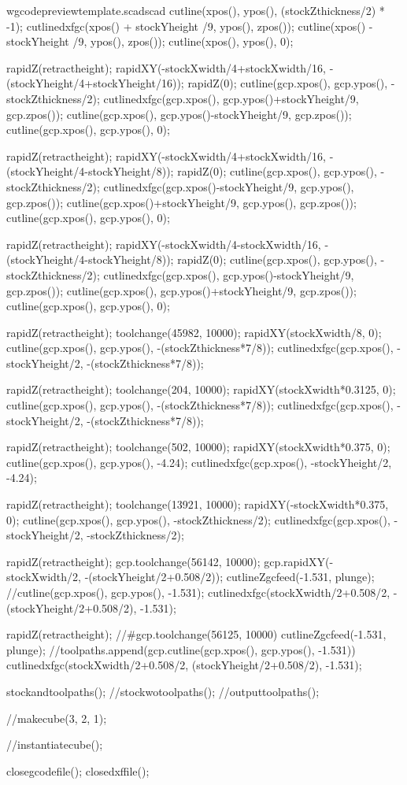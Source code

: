 \documentclass{ltxdoc}
\begin{document}
\begin{writecode}{w}{gcodepreviewtemplate.scad}{scad}
cutline(xpos(), ypos(), (stockZthickness/2) * -1);
cutlinedxfgc(xpos() + stockYheight /9, ypos(), zpos());
cutline(xpos() - stockYheight /9, ypos(), zpos());
cutline(xpos(), ypos(), 0);

rapidZ(retractheight);
rapidXY(-stockXwidth/4+stockXwidth/16, -(stockYheight/4+stockYheight/16));
rapidZ(0);
cutline(gcp.xpos(), gcp.ypos(), -stockZthickness/2);
cutlinedxfgc(gcp.xpos(), gcp.ypos()+stockYheight/9, gcp.zpos());
cutline(gcp.xpos(), gcp.ypos()-stockYheight/9, gcp.zpos());
cutline(gcp.xpos(), gcp.ypos(), 0);

rapidZ(retractheight);
rapidXY(-stockXwidth/4+stockXwidth/16, -(stockYheight/4-stockYheight/8));
rapidZ(0);
cutline(gcp.xpos(), gcp.ypos(), -stockZthickness/2);
cutlinedxfgc(gcp.xpos()-stockYheight/9, gcp.ypos(), gcp.zpos());
cutline(gcp.xpos()+stockYheight/9, gcp.ypos(), gcp.zpos());
cutline(gcp.xpos(), gcp.ypos(), 0);

rapidZ(retractheight);
rapidXY(-stockXwidth/4-stockXwidth/16, -(stockYheight/4-stockYheight/8));
rapidZ(0);
cutline(gcp.xpos(), gcp.ypos(), -stockZthickness/2);
cutlinedxfgc(gcp.xpos(), gcp.ypos()-stockYheight/9, gcp.zpos());
cutline(gcp.xpos(), gcp.ypos()+stockYheight/9, gcp.zpos());
cutline(gcp.xpos(), gcp.ypos(), 0);

rapidZ(retractheight);
toolchange(45982, 10000);
rapidXY(stockXwidth/8, 0);
cutline(gcp.xpos(), gcp.ypos(), -(stockZthickness*7/8));
cutlinedxfgc(gcp.xpos(), -stockYheight/2, -(stockZthickness*7/8));

rapidZ(retractheight);
toolchange(204, 10000);
rapidXY(stockXwidth*0.3125, 0);
cutline(gcp.xpos(), gcp.ypos(), -(stockZthickness*7/8));
cutlinedxfgc(gcp.xpos(), -stockYheight/2, -(stockZthickness*7/8));

rapidZ(retractheight);
toolchange(502, 10000);
rapidXY(stockXwidth*0.375, 0);
cutline(gcp.xpos(), gcp.ypos(), -4.24);
cutlinedxfgc(gcp.xpos(), -stockYheight/2, -4.24);

rapidZ(retractheight);
toolchange(13921, 10000);
rapidXY(-stockXwidth*0.375, 0);
cutline(gcp.xpos(), gcp.ypos(), -stockZthickness/2);
cutlinedxfgc(gcp.xpos(), -stockYheight/2, -stockZthickness/2);

rapidZ(retractheight);
gcp.toolchange(56142, 10000);
gcp.rapidXY(-stockXwidth/2, -(stockYheight/2+0.508/2));
cutlineZgcfeed(-1.531, plunge);
//cutline(gcp.xpos(), gcp.ypos(), -1.531);
cutlinedxfgc(stockXwidth/2+0.508/2, -(stockYheight/2+0.508/2), -1.531);

rapidZ(retractheight);
//#gcp.toolchange(56125, 10000)
cutlineZgcfeed(-1.531, plunge);
//toolpaths.append(gcp.cutline(gcp.xpos(), gcp.ypos(), -1.531))
cutlinedxfgc(stockXwidth/2+0.508/2, (stockYheight/2+0.508/2), -1.531);

stockandtoolpaths();
//stockwotoolpaths();
//outputtoolpaths();

//makecube(3, 2, 1);

//instantiatecube();

closegcodefile();
closedxffile();

\end{writecode}
\addtocounter{gcptmplscad}{292}
\end{document}
